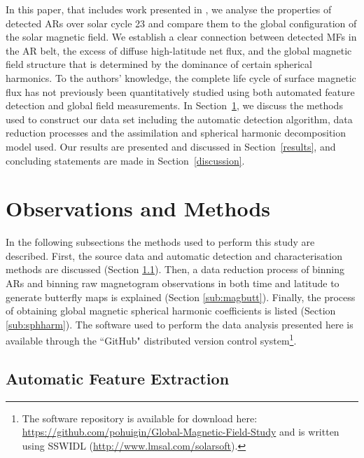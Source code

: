 \documentclass[namedreferences]{solarphysics}
\begin{document}
\begin{article}
In this paper, that includes work presented in \citet{Higgins:thesis}, we analyse the properties of detected ARs over solar cycle 23 and compare them to the global configuration of the solar magnetic field. %
We establish a clear connection between detected MFs in the AR belt, the excess of diffuse high-latitude net flux, and the global magnetic field structure that is determined by the dominance of certain spherical harmonics. To the authors' knowledge, the complete life cycle of surface magnetic flux has not previously been quantitatively studied using both automated feature detection and global field measurements.  
In Section~\ref{obs_and_meth}, we discuss the methods used to construct our data set including the automatic detection algorithm, data reduction processes and the assimilation and spherical harmonic decomposition model used. Our results are presented and discussed in Section~\ref{results}, and concluding statements are made in Section~\ref{discussion}.


\section{Observations and Methods}\label{obs_and_meth}

In the following subsections the methods used to perform this study are described. First, the source data and automatic detection and characterisation methods are discussed (Section \ref{sub:autofeat}). Then, a data reduction process of binning ARs and binning raw magnetogram observations in both time and latitude to generate butterfly maps is explained (Section \ref{sub:magbutt}). Finally, the process of obtaining global magnetic spherical harmonic coefficients is listed (Section \ref{sub:sphharm}). The software used to perform the data analysis presented here is available through the ``GitHub" distributed version control system\footnote{The software repository is available for download here: \url{https://github.com/pohuigin/Global-Magnetic-Field-Study} and is written using SSWIDL (\url{http://www.lmsal.com/solarsoft}).}.


\subsection{Automatic Feature Extraction}\label{sub:autofeat}


\end{article}
\end{document}
